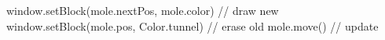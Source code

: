 \begin{enumerate}[leftmargin=*]

\begin{CodeSmall}
window.setBlock(mole.nextPos, mole.color) // draw new
window.setBlock(mole.pos, Color.tunnel)   // erase old
mole.move()                               // update
\end{CodeSmall}

\end{enumerate}
